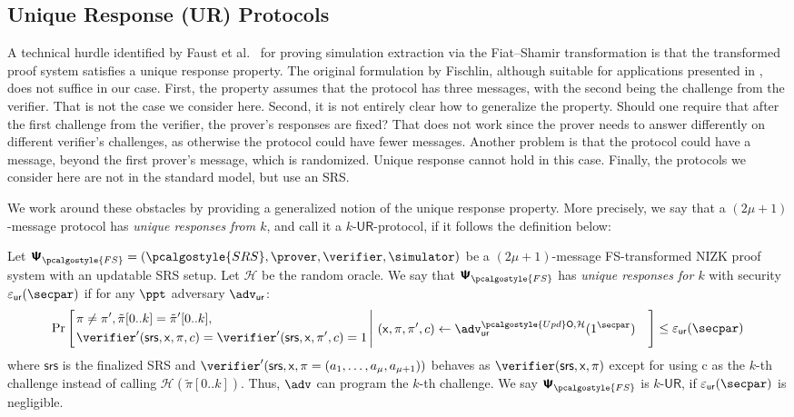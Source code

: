 \documentclass[10pt]{llncs}
\newcommand{\SRScer}{\pcalgostyle{SRS}}
\newcommand{\initU}{\pcalgostyle{Upd}\oracleo}
\newcommand{\pcvarstyle}[1]{\mathsf{#1}}
\newcommand{\eps}{\varepsilon}
\newcommand{\oracleo}{\mathsf{O}}
\newcommand{\srs}{\pcvarstyle{srs}}
\newcommand{\zkproof}{\pi}
\newcommand{\tzkproof}{\tilde{\zkproof}}
\newcommand{\proofsystem}{\pcschemestyle{\Psi}}
\newcommand{\psfs}{\proofsystem_\fs}
\newcommand{\ro}{\mathcal{H}}
\newcommand{\fs}{\pcalgostyle{FS}}
\newcommand{\pcschemestyle}[1]{\bm{\mathsf{#1}}}
\newcommand{\inp}{\pcvarstyle{x}}
\newcommand{\ur}[1]{{#1\text{-}\mathsf{UR}}}
\newcommand{\advur}{\adv_{\pcvarstyle{ur}}}
\newcommand{\epsur}{\eps_\pcvarstyle{ur}}
\begin{document}
\subsection{Unique Response (UR) Protocols}
A technical hurdle identified by Faust et al.~\cite{INDOCRYPT:FKMV12} for proving
simulation extraction via the Fiat--Shamir transformation is that the transformed
proof system satisfies a unique response property. The original formulation by Fischlin, although suitable for applications presented in
\cite{C:Fischlin05,INDOCRYPT:FKMV12}, does not suffice in our case. First, the
property assumes that the protocol has three messages, with the second being the
challenge from the verifier. That is not the case we consider here. Second, it is not
entirely clear how to generalize the property. Should one require that after the
first challenge from the verifier, the prover's responses are fixed?  That does not
work since the prover needs to answer differently on different verifier's challenges,
as otherwise the protocol could have fewer messages.  Another problem is that the
protocol could have a message, beyond the first prover's message, which is
randomized. Unique response cannot hold in this case. Finally, the protocols we
consider here are not in the standard model, but use an SRS.

We work around these obstacles by providing a generalized notion of the unique
response property. More precisely, we say that a $(2\mu + 1)$-message protocol
has \emph{unique responses from $k$}, and call it a $\ur{k}$-protocol, if it
follows the definition below:

\begin{definition}
	Let $\psfs = (\SRScer, \prover, \verifier, \simulator)$ be a $(2\mu + 1)$-message FS-transformed NIZK proof system with an updatable SRS setup. Let $\ro$ be the random oracle. 
	We say that $\psfs$ has \emph{unique responses for $k$} with security $\epsur(\secpar)$ if for any $\ppt$ adversary $\advur$:
	\[
	\Pr\left[
	\left.
	\begin{aligned}
	& \zkproof \neq \zkproof', \tzkproof[0..k] = \tzkproof'[0..k],  \\
	& \verifier' (\srs, \inp, \zkproof,c) =
	\verifier' (\srs, \inp, \zkproof',c) = 1  \\
	\end{aligned}
	\,\right|\,
	\begin{aligned}
	& (\inp, \zkproof, \zkproof', c) \gets \advur^{\initU,\ro}(1^\secpar) 
	\end{aligned}
	\right] \leq \epsur(\secpar) 
	\]
	where $\srs$ is the finalized SRS and $\verifier'(\srs,\inp,\zkproof=(a_1, \dots, a_\mu,a_{\mu+1}))$ behaves as $\verifier (\srs, \inp, \zkproof)$ except for using c as the $k$-th challenge instead of calling $\ro(\tzkproof[0..k]) $. Thus, $\adv$ can program the $k$-th challenge. 
	We say $\psfs$  is $\ur{k}$, if $\epsur(\secpar)$ is negligible.
\end{definition}
\end{document}
